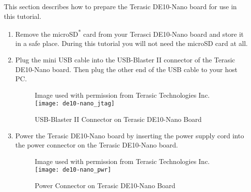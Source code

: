 \begin{flushleft}
\noindent

This section describes how to prepare the Terasic DE10-Nano board for use in this tutorial.

\begin{enumerate}[
	label=\textbf{Step \arabic*.},
	leftmargin=*,
	widest={00},
	align=left]

\item Remove the microSD\textsuperscript{*} card from your Terasci DE10-Nano board and store it in a safe place.  During this tutorial you will not need the microSD card at all.

\item Plug the mini USB cable into the USB-Blaster II connector of the Terasic DE10-Nano board.  Then plug the other end of the USB cable to your host PC.

\begin{figure}[H]
\centering
\scriptsize{Image used with permission from Terasic Technologies Inc.}
\newline
\texttt{[image: de10-nano\_jtag]}
\caption{USB-Blaster II Connector on Terasic DE10-Nano Board}
\label{fig:de10-nano_jtag}
\end{figure}

\newpage

\item Power the Terasic DE10-Nano board by inserting the power supply cord into the power connector on the Terasic DE10-Nano board.

\begin{figure}[H]
\centering
\scriptsize{Image used with permission from Terasic Technologies Inc.}
\newline
\texttt{[image: de10-nano\_pwr]}
\caption{Power Connector on Terasic DE10-Nano Board}
\label{fig:de10-nano_pwr}
\end{figure}

\end{enumerate}

\end{flushleft}

\newpage

